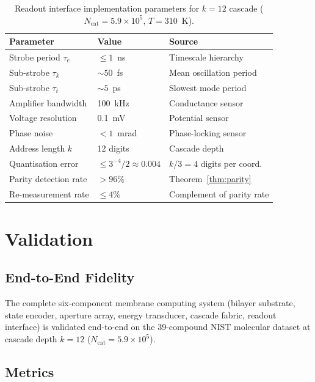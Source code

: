 \documentclass[11pt,twocolumn,a4paper]{article}
\theoremstyle{definition}
\theoremstyle{remark}
\begin{document}
\begin{table}[h]
\centering
\small
\caption{Readout interface implementation parameters for $k = 12$ cascade
($N_{\mathrm{cat}} = 5.9 \times 10^5$, $T = 310$~K).}
\label{tab:implparams}
\setlength{\tabcolsep}{3.5pt}
\begin{tabular}{lll}
\toprule
Parameter & Value & Source \\
\midrule
Strobe period $\tau_e$ & $\leq 1$~ns & Timescale hierarchy \\
Sub-strobe $\tau_k$ & $\sim 50$~fs & Mean oscillation period \\
Sub-strobe $\tau_t$ & $\sim 5$~ps  & Slowest mode period \\
Amplifier bandwidth & 100~kHz & Conductance sensor \\
Voltage resolution & 0.1~mV & Potential sensor \\
Phase noise & $< 1$~mrad & Phase-locking sensor \\
Address length $k$ & 12 digits & Cascade depth \\
Quantisation error & $\leq 3^{-4}/2 \approx 0.004$ & $k/3 = 4$ digits per coord. \\
Parity detection rate & $> 96\%$ & Theorem~\ref{thm:parity} \\
Re-measurement rate & $\leq 4\%$ & Complement of parity rate \\
\bottomrule
\end{tabular}
\end{table}

\section{Validation}
\label{sec:validation}

\subsection{End-to-End Fidelity}

The complete six-component membrane computing system (bilayer substrate,
state encoder, aperture array, energy transducer, cascade fabric, readout
interface) is validated end-to-end on the 39-compound NIST molecular dataset
\citep{nist2023} at cascade depth $k = 12$ ($N_{\mathrm{cat}} = 5.9 \times 10^5$).

\subsection{Metrics}
\end{document}
